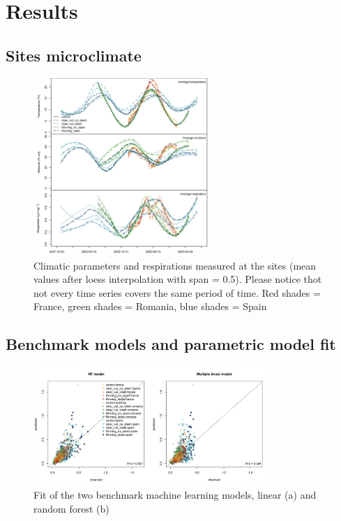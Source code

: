 \documentclass[
]{article}
\begin{document}
\section{Results}\label{results}

\subsection{Sites microclimate}\label{sites-microclimate}

\begin{figure}
\centering
\includegraphics[width=0.6\textwidth,height=\textheight]{../Figures/climatedata_means.png}
\caption{Climatic parameters and respirations measured at the sites (mean values after loess interpolation with span = 0.5). Please notice thot not every time series covers the same period of time. Red shades = France, green shades = Romania, blue shades = Spain}
\end{figure}

\subsection{Benchmark models and parametric model fit}\label{benchmark-models-and-parametric-model-fit}

\begin{figure}
\centering
\includegraphics[width=0.8\textwidth,height=\textheight]{../Figures/fit_ML_validation.png}
\caption{Fit of the two benchmark machine learning models, linear (a) and random forest (b)}
\end{figure}
\end{document}

